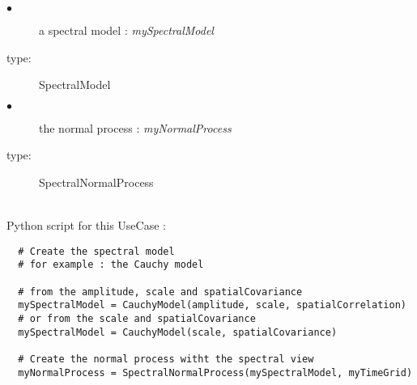 {
  \begin{description}
  \item[$\bullet$] a spectral model : {\itshape mySpectralModel }
  \item[type:] SpectralModel
  \end{description}

  \begin{description}
  \item[$\bullet$] the normal process : {\itshape myNormalProcess}
  \item[type:]  SpectralNormalProcess 
  \end{description}

}

\textspace\\
Python script for this UseCase :

\begin{lstlisting}
  # Create the spectral model
  # for example : the Cauchy model

  # from the amplitude, scale and spatialCovariance
  mySpectralModel = CauchyModel(amplitude, scale, spatialCorrelation)
  # or from the scale and spatialCovariance
  mySpectralModel = CauchyModel(scale, spatialCovariance)

  # Create the normal process witht the spectral view
  myNormalProcess = SpectralNormalProcess(mySpectralModel, myTimeGrid)
\end{lstlisting}



